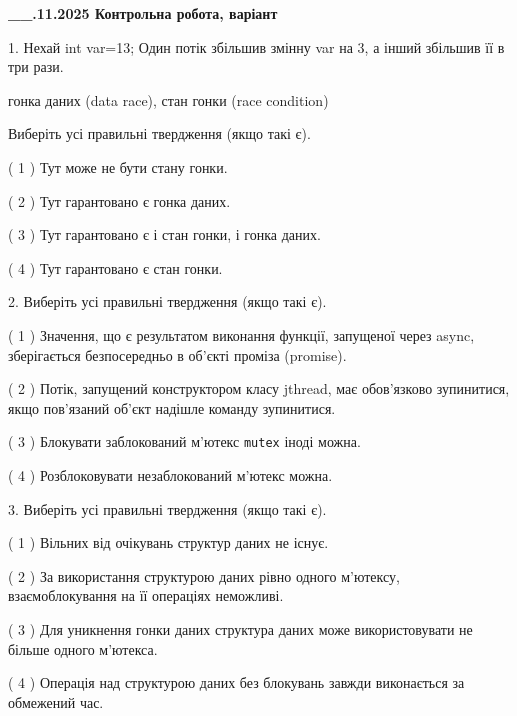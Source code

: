 \documentclass[12pt, ukrainian]{article}
\def\code#1{\Verb!#1!}
\begin{document}
\newpage
\begin {large}

\textbf{\_\_.11.2025 Контрольна робота, варіант  }\par


{
1. Нехай int var=13; Один потік збільшив змінну var на 3, а інший збільшив її в три рази.

гонка даних (data race), стан гонки (race condition)

Виберіть усі правильні твердження (якщо такі є).\par
\vspace{2mm}
( 1 ) Тут може не бути стану гонки.%

( 2 ) Тут гарантовано є гонка даних.%

( 3 ) Тут гарантовано є і стан гонки, і гонка даних.%

( 4 ) Тут гарантовано є стан гонки.%


2. Виберіть усі правильні твердження (якщо такі є).\par
\vspace{2mm}

( 1 ) Значення, що є результатом виконання функції, запущеної через async, зберігається безпосередньо в об’єкті проміза (promise).%

( 2 ) Потік, запущений конструктором класу jthread, має обов’язково зупинитися, якщо пов’язаний об’єкт надішле команду зупинитися.%

( 3 ) Блокувати заблокований м’ютекс  \code{mutex} іноді можна.%

( 4 ) Розблоковувати незаблокований м’ютекс можна.%


3. Виберіть усі правильні твердження (якщо такі є).\par
\vspace{2mm}

( 1 ) Вільних від очікувань структур даних не існує.%

( 2 ) За використання структурою даних рівно одного м’ютексу, взаємоблокування на її операціях неможливі.%

( 3 ) Для уникнення гонки даних структура даних може використовувати не більше одного м’ютекса.%

( 4 ) Операція над структурою даних без блокувань завжди виконається за обмежений час.%


}
\end{large}
\end{document}
